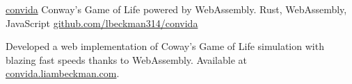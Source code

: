 \showoff
{\textcolor{my-blue}{\href{https://convida.liambeckman.com/}{convida}}}
{Conway's Game of Life powered by WebAssembly.}
{Rust, WebAssembly, JavaScript}
{\textcolor{my-blue}{\href{https://github.com/lbeckman314/convida}{github.com/lbeckman314/convida}}}

Developed a web implementation of Coway's Game of Life simulation with blazing fast speeds thanks to WebAssembly. Available at \textcolor{my-blue}{\href{https://convida.liambeckman.com}{convida.liambeckman.com}}.

\myBreak
